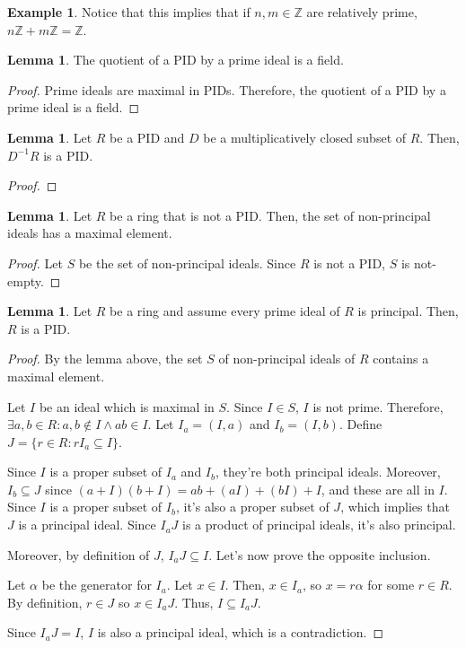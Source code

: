 \documentclass{article}
\theoremstyle{definition}
\newtheorem{lemma}[theorem]{Lemma}
\newtheorem{example}[theorem]{Example}
\newcommand{\Z}{\mathbb{Z}}
\begin{document}
\begin{example}
    Notice that this implies that if $n,m \in \Z$ are relatively prime, $n\Z + m\Z = \Z$.
\end{example}

\begin{lemma}
    The quotient of a PID by a prime ideal is a field.
\end{lemma}
\begin{proof}
    Prime ideals are maximal in PIDs. Therefore, the quotient of a PID by a prime ideal is a field.
\end{proof}

\begin{lemma}
    Let $R$ be a PID and $D$ be a multiplicatively closed subset of $R$. Then, $D^{-1}R$ is a PID.
\end{lemma}
\begin{proof}
    
\end{proof}

\begin{lemma}
    Let $R$ be a ring that is not a PID. Then, the set of non-principal ideals has a maximal element.
\end{lemma}
\begin{proof}
    Let $S$ be the set of non-principal ideals. Since $R$ is not a PID, $S$ is not-empty. 
\end{proof}


\begin{lemma}
    Let $R$ be a ring and assume every prime ideal of $R$ is principal. Then, $R$ is a PID.
\end{lemma}
\begin{proof}
    By the lemma above, the set $S$ of non-principal ideals of $R$ contains a maximal element. 

    Let $I$ be an ideal which is maximal in $S$. Since $I \in S$, $I$ is not prime. Therefore, $\exists a,b \in R: a,b \notin I \land ab \in I$. Let $I_{a} = (I,a)$ and $I_{b} = (I,b)$. Define $J = \{ r \in R: rI_{a} \subseteq I \}$. 

    Since $I$ is a proper subset of $I_{a}$ and $I_{b}$, they're both principal ideals. Moreover, $I_{b} \subseteq J$ since $(a + I)(b + I) = ab + (aI) + (bI) + I$, and these are all in $I$. Since $I$ is a proper subset of $I_{b}$, it's also a proper subset of $J$, which implies that $J$ is a principal ideal. Since $I_{a}J$ is a product of principal ideals, it's also principal.
    
    Moreover, by definition of $J$, $I_{a}J \subseteq I$. Let's now prove the opposite inclusion.
    
    Let $\alpha$ be the generator for $I_{a}$. Let $x \in I$. Then, $x \in I_{a}$, so $x = r \alpha$ for some $r \in R$. By definition, $r \in J$ so $x \in I_{a}J$. Thus, $I \subseteq I_{a}J$.

    Since $I_{a}J = I$, $I$ is also a principal ideal, which is a contradiction. 
\end{proof}
\end{document}
